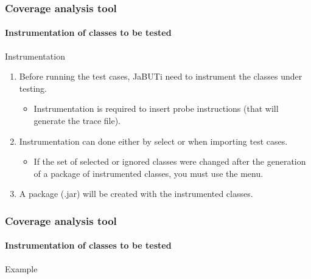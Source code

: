 \begin{frame}[parent={cmap:coverage-analysis-tool},hasnext=true,hasprev=true]
\frametitle{Coverage analysis tool}
\framesubtitle{Instrumentation of classes to be tested}
\label{concept:jabuti-instrumentation}

\begin{block:procedure}{Instrumentation}
\begin{enumerate}
	\item Before running the test cases, JaBUTi need to instrument the classes
	under testing.
	\begin{itemize}
		\item Instrumentation is required to insert probe instructions (that
		will generate the trace file).
	\end{itemize}

	\item Instrumentation can done either by select  or when importing test cases.
	\begin{itemize}
		\item If the set of selected or ignored classes were changed after the
		generation of a package of instrumented classes, you must use the
		 menu.
	\end{itemize}

	\item A package (.jar) will be created with the instrumented classes.
\end{enumerate}
\end{block:procedure}
\end{frame}


\begin{frame}
\frametitle{Coverage analysis tool}
\framesubtitle{Instrumentation of classes to be tested}

\begin{block}{Example}
\end{block}
\end{frame}

